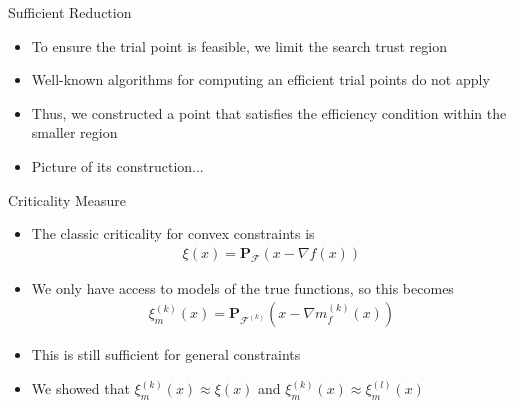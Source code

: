 \documentclass{beamer}
\newcommand{\feasible}{\mathcal F}
\newcommand{\feasiblek}{\mathcal F^{(k)}}
\newcommand{\proj}{\textbf{P}}
\begin{document}
\begin{frame}{Sufficient Reduction}
\begin{itemize}
\item To ensure the trial point is feasible, we limit the search trust region
\item Well-known algorithms for computing an efficient trial points do not apply
\item Thus, we constructed a point that satisfies the efficiency condition within the smaller region
\color{red}
\item Picture of its construction...
\color{black}
\end{itemize}
\end{frame}


\begin{frame}{Criticality Measure}
	\begin{itemize}
		\item The classic criticality for convex constraints is
\begin{align*}
\xi(x) = \proj_{\feasible}\left(x - \nabla f(x)\right)
\end{align*}
		\item We only have access to models of the true functions, so this becomes
\begin{align*}
\xi_m^{(k)}(x) = \proj_{\feasiblek}\left(x - \nabla m_f^{(k)}(x)\right)
\end{align*}
		\item This is still sufficient for general constraints
		\item We showed that $\xi_m^{(k)}(x) \approx \xi(x)$ and $\xi_m^{(k)}(x) \approx \xi_m^{(l)}(x)$
	\end{itemize}
\end{frame}


\end{document}

